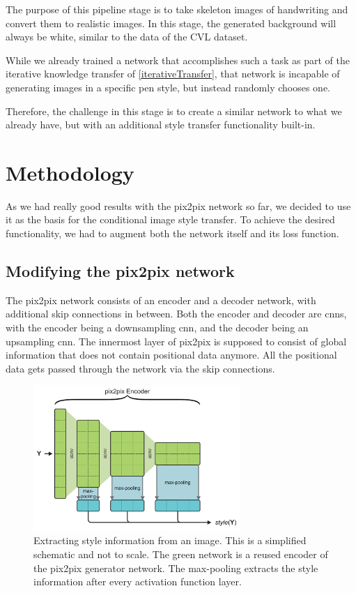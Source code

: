 The purpose of this pipeline stage is to take skeleton images of handwriting and convert them to realistic images. In this stage, the generated background will always be white, similar to the data of the CVL dataset. ~\cite{cvl}

While we already trained a network that accomplishes such a task as part of the iterative knowledge transfer of  \cref{iterativeTransfer}, that network is incapable of generating images in a specific pen style, but instead randomly chooses one.

Therefore, the challenge in this stage is to create a similar network to what we already have, but with an additional style transfer functionality built-in.

\section{Methodology}

As we had really good results with the \gls{pix2pix} network so far, we decided to use it as the basis for the conditional image style transfer. To achieve the desired functionality, we had to augment both the network itself and its loss function.

\subsection{Modifying the pix2pix network}
The pix2pix network consists of an encoder and a decoder network, with additional skip connections in between. Both the encoder and decoder are \glspl{cnn}, with the encoder being a downsampling \gls{cnn}, and the decoder being an upsampling \gls{cnn}. The innermost layer of pix2pix is supposed to consist of global information that does not contain positional data anymore. All the positional data gets passed through the network via the skip connections.

\begin{figure}
  \centering
  \includegraphics[width=0.70\textwidth]{../assets/pen_style_transfer/styleExtraction.pdf}
  \caption[Extracting style information from an image]{Extracting style information from an image. This is a simplified schematic and not to scale. The green network is a reused encoder of the pix2pix generator network. The max-pooling extracts the style information after every activation function layer.}
  \label{fig:penStyleExtraction}
\end{figure}

